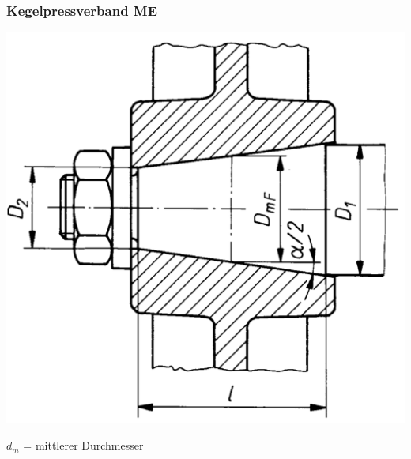 \subsubsection{Kegelpressverband \hfill ME}
\begin{footnotesize}
    \begin{minipage}{0.3\linewidth}
        \begin{center}
            \includegraphics[width = 1.0\linewidth]{MAEIP_Kegelpressverband}
        \end{center}
    \end{minipage}
    \begin{minipage}{0.58\linewidth}
        \begin{center}
            \scriptsize{$d_m$ = mittlerer Durchmesser} 
            \vspace{-1mm}
        \end{center}
    \end{minipage}
\end{footnotesize}